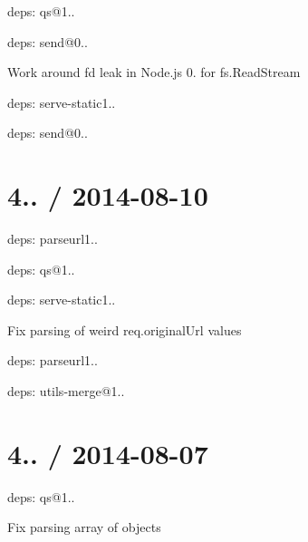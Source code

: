 {\ttfamily }

{\ttfamily 
\begin{DoxyItemize}
\item deps\+: qs@1..
\item deps\+: send@0..
\begin{DoxyItemize}
\item Work around {\ttfamily fd} leak in Node.\+js 0. for {\ttfamily fs.\+Read\+Stream}
\end{DoxyItemize}
\item deps\+: serve-\/static1..
\begin{DoxyItemize}
\item deps\+: send@0..
\end{DoxyItemize}
\end{DoxyItemize}}

{\ttfamily \section*{4.. / 2014-\/08-\/10 }}

{\ttfamily }

{\ttfamily 
\begin{DoxyItemize}
\item deps\+: parseurl1..
\item deps\+: qs@1..
\item deps\+: serve-\/static1..
\begin{DoxyItemize}
\item Fix parsing of weird {\ttfamily req.\+original\+Url} values
\item deps\+: parseurl1..
\item deps\+: utils-\/merge@1..
\end{DoxyItemize}
\end{DoxyItemize}}

{\ttfamily \section*{4.. / 2014-\/08-\/07 }}

{\ttfamily }

{\ttfamily 
\begin{DoxyItemize}
\item deps\+: qs@1..
\begin{DoxyItemize}
\item Fix parsing array of objects
\end{DoxyItemize}
\end{DoxyItemize}}

